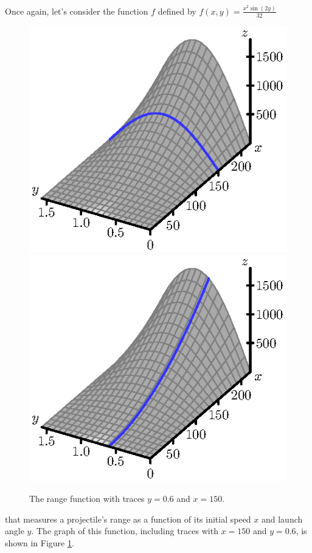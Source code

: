 \begin{pa} \label{PA:10.3} Once again, let's consider the function $f$ defined by $ f(x,y) = \frac{x^2\sin(2y)}{32}$ 
  \begin{figure}[ht]
    \begin{center}
      \includegraphics{figures/fig_10_2_trace_x_a.eps}
      \hspace*{20pt}
      \includegraphics{figures/fig_10_2_trace_y_a.eps}
    \end{center}
    \caption{The range function with traces $y=0.6$ and $x=150$.}
    \label{F:10.3.preview}
  \end{figure}
that measures a projectile's range as a function of its
  initial speed $x$ and launch angle $y$.  The graph of this function,
  including traces with $x=150$ and $y=0.6$, is shown in Figure
  \ref{F:10.3.preview}. 


\end{pa}
